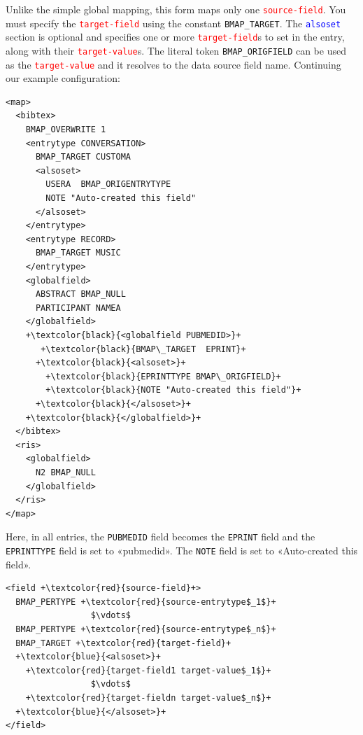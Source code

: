\documentclass{ltxdockit}
\begin{document}
\noindent Unlike the simple global mapping, this form maps only one
\textcolor{red}{\texttt{source-field}}. You must specify the
\textcolor{red}{\texttt{target-field}} using the constant
\verb+BMAP_TARGET+. The \textcolor{blue}{\texttt{alsoset}} section is
optional and specifies one or more \textcolor{red}{\texttt{target-field}}s
to set in the entry, along with their
\textcolor{red}{\texttt{target-value}}s. The literal token
\verb+BMAP_ORIGFIELD+ can be used as the
\textcolor{red}{\texttt{target-value}} and it resolves to the data source
field name. Continuing our example configuration:

{\color{grey}
\lstset{showspaces=false}
\begin{lstlisting}[escapechar=+,mathescape=true]
<map>
  <bibtex>
    BMAP_OVERWRITE 1
    <entrytype CONVERSATION>
      BMAP_TARGET CUSTOMA
      <alsoset>
        USERA  BMAP_ORIGENTRYTYPE
        NOTE "Auto-created this field"
      </alsoset>
    </entrytype>
    <entrytype RECORD>
      BMAP_TARGET MUSIC
    </entrytype>
    <globalfield>
      ABSTRACT BMAP_NULL
      PARTICIPANT NAMEA
    </globalfield>
    +\textcolor{black}{<globalfield PUBMEDID>}+
       +\textcolor{black}{BMAP\_TARGET  EPRINT}+
      +\textcolor{black}{<alsoset>}+
        +\textcolor{black}{EPRINTTYPE BMAP\_ORIGFIELD}+
        +\textcolor{black}{NOTE "Auto-created this field"}+
      +\textcolor{black}{</alsoset>}+
    +\textcolor{black}{</globalfield>}+
  </bibtex>
  <ris>
    <globalfield>
      N2 BMAP_NULL
    </globalfield>
  </ris>
</map>
\end{lstlisting}
}

\noindent Here, in all entries, the \verb+PUBMEDID+ field becomes the
\verb+EPRINT+ field and the \verb+EPRINTTYPE+ field is set to «pubmedid».
The \verb+NOTE+ field is set to «Auto-created this field».
\bigskip
{}

\lstset{showspaces=false}
\begin{lstlisting}[escapechar=+,mathescape=true]
<field +\textcolor{red}{source-field}+>
  BMAP_PERTYPE +\textcolor{red}{source-entrytype$_1$}+
                 $\vdots$
  BMAP_PERTYPE +\textcolor{red}{source-entrytype$_n$}+
  BMAP_TARGET +\textcolor{red}{target-field}+
  +\textcolor{blue}{<alsoset>}+
    +\textcolor{red}{target-field1 target-value$_1$}+
                 $\vdots$
    +\textcolor{red}{target-fieldn target-value$_n$}+
  +\textcolor{blue}{</alsoset>}+
</field>
\end{lstlisting}
\end{document}
